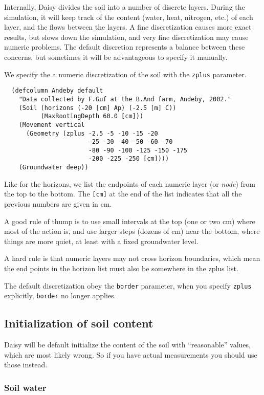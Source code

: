 \documentclass[a4paper]{article}
\begin{document}
Internally, Daisy divides the soil into a number of discrete layers.
During the simulation, it will keep track of the content (water, heat,
nitrogen, etc.) of each layer, and the flows between the layers. A
fine discretization causes more exact results, but slows down the
simulation, and very fine discretization may cause numeric problems.
The default discretion represents a balance between these concerns,
but sometimes it will be advantageous to specify it manually.

We specify the a numeric discretization of the soil with the
\texttt{zplus} parameter.  
\begin{verbatim}
  (defcolumn Andeby default
    "Data collected by F.Guf at the B.And farm, Andeby, 2002."
    (Soil (horizons (-20 [cm] Ap) (-2.5 [m] C))
          (MaxRootingDepth 60.0 [cm]))
    (Movement vertical 
      (Geometry (zplus -2.5 -5 -10 -15 -20
                       -25 -30 -40 -50 -60 -70
                       -80 -90 -100 -125 -150 -175
                       -200 -225 -250 [cm])))
    (Groundwater deep))
\end{verbatim}
Like for the horizons, we list the endpoints of each numeric layer (or
\emph{node}) from the top to the bottom.  The \verb|[cm]| at the end
of the list indicates that all the previous numbers are given in cm.

A good rule of thump is to use small intervals at the top (one or two
cm) where most of the action is, and use larger steps (dozens of cm)
near the bottom, where things are more quiet, at least with a fixed
groundwater level.

A hard rule is that numeric layers may not cross horizon boundaries,
which mean the end points in the horizon list must also be somewhere
in the zplus list.

The default discretization obey the \texttt{border} parameter, when
you specify \texttt{zplus} explicitly, \texttt{border} no longer
applies.

\subsection{Initialization of soil content}
\label{sec:init}

Daisy will be default initialize the content of the soil with
``reasonable'' values, which are most likely wrong.  So if you have
actual measurements you should use those instead.  

\subsubsection{Soil water}
\end{document}
